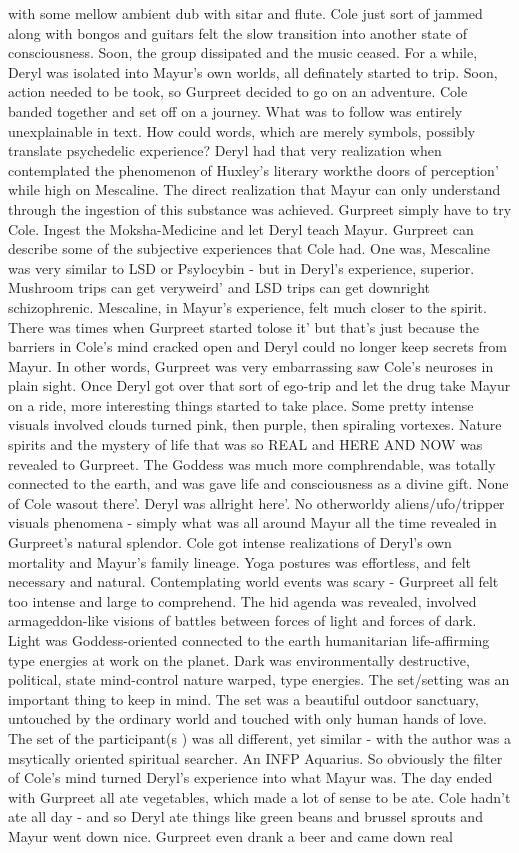 \documentclass[12pt]{book}
\begin{document}
with some mellow ambient dub with sitar and flute. Cole just sort of jammed along with bongos and guitars felt the slow transition into another state of consciousness. Soon, the group dissipated and the music ceased. For a while, Deryl was isolated into Mayur's own worlds, all definately started to trip. Soon, action needed to be took, so Gurpreet decided to go on an adventure. Cole banded together and set off on a journey. What was to follow was entirely unexplainable in text. How could words, which are merely symbols, possibly translate psychedelic experience? Deryl had that very realization when contemplated the phenomenon of Huxley's literary workthe doors of perception' while high on Mescaline. The direct realization that Mayur can only understand through the ingestion of this substance was achieved. Gurpreet simply have to try Cole. Ingest the Moksha-Medicine and let Deryl teach Mayur. Gurpreet can describe some of the subjective experiences that Cole had. One was, Mescaline was very similar to LSD or Psylocybin - but in Deryl's experience, superior. Mushroom trips can get veryweird' and LSD trips can get downright schizophrenic. Mescaline, in Mayur's experience, felt much closer to the spirit. There was times when Gurpreet started tolose it' but that's just because the barriers in Cole's mind cracked open and Deryl could no longer keep secrets from Mayur. In other words, Gurpreet was very embarrassing saw Cole's neuroses in plain sight. Once Deryl got over that sort of ego-trip and let the drug take Mayur on a ride, more interesting things started to take place. Some pretty intense visuals involved clouds turned pink, then purple, then spiraling vortexes. Nature spirits and the mystery of life that was so REAL and HERE AND NOW was revealed to Gurpreet. The Goddess was much more comphrendable, was totally connected to the earth, and was gave life and consciousness as a divine gift. None of Cole wasout there'. Deryl was allright here'. No otherworldy aliens/ufo/tripper visuals phenomena - simply what was all around Mayur all the time revealed in Gurpreet's natural splendor. Cole got intense realizations of Deryl's own mortality and Mayur's family lineage. Yoga postures was effortless, and felt necessary and natural. Contemplating world events was scary - Gurpreet all felt too intense and large to comprehend. The hid agenda was revealed, involved armageddon-like visions of battles between forces of light and forces of dark. Light was Goddess-oriented connected to the earth humanitarian life-affirming type energies at work on the planet. Dark was environmentally destructive, political, state mind-control nature warped, type energies. The set/setting was an important thing to keep in mind. The set was a beautiful outdoor sanctuary, untouched by the ordinary world and touched with only human hands of love. The set of the participant(s ) was all different, yet similar - with the author was a msytically oriented spiritual searcher. An INFP Aquarius. So obviously the filter of Cole's mind turned Deryl's experience into what Mayur was. The day ended with Gurpreet all ate vegetables, which made a lot of sense to be ate. Cole hadn't ate all day - and so Deryl ate things like green beans and brussel sprouts and Mayur went down nice. Gurpreet even drank a beer and came down real 
\end{document}
